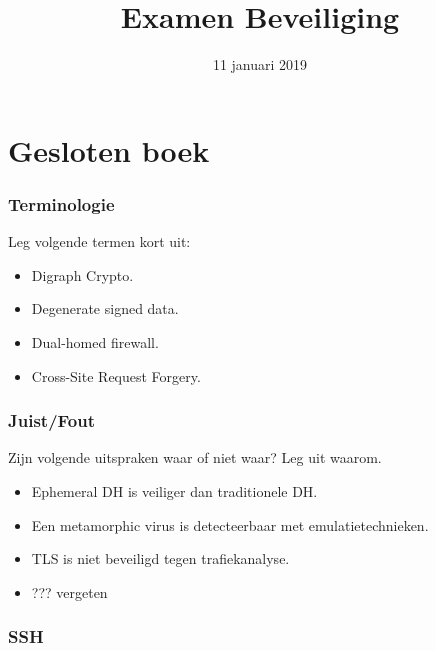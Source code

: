 \documentclass{article}
\begin{document}
\title{Examen Beveiliging}
\date{11 januari 2019}
\author{}
\maketitle

\part{Gesloten boek}
\section{Terminologie}
Leg volgende termen kort uit:
\begin{itemize}
    \item Digraph Crypto.
    \item Degenerate signed data.
    \item Dual-homed firewall.
    \item Cross-Site Request Forgery.
\end{itemize}

\section{Juist/Fout}
Zijn volgende uitspraken waar of niet waar? Leg uit waarom.
\begin{itemize}
    \item Ephemeral DH is veiliger dan traditionele DH.
    \item Een metamorphic virus is detecteerbaar met emulatietechnieken.
    \item TLS is niet beveiligd tegen trafiekanalyse.
    \item ??? vergeten
\end{itemize}

\section{SSH}
\end{document}
